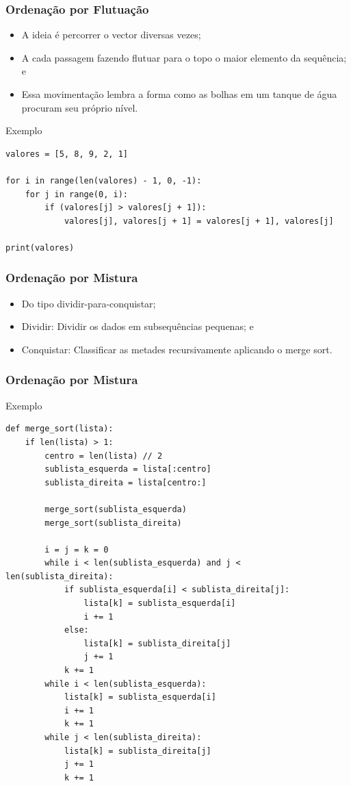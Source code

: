 \documentclass{beamer}
\begin{document}
\begin{frame}[fragile]
\frametitle{Ordenação por Flutuação}

\begin{itemize}
	\item A ideia é percorrer o vector diversas vezes;
	\item A cada passagem fazendo flutuar para o topo o maior elemento da
	sequência; e
	\item Essa movimentação lembra a forma como as bolhas em um tanque de
	água procuram seu próprio nível.
\end{itemize}

\begin{exampleblock}{Exemplo}
	\begin{lstlisting}
valores = [5, 8, 9, 2, 1]

for i in range(len(valores) - 1, 0, -1):
    for j in range(0, i):
        if (valores[j] > valores[j + 1]):
            valores[j], valores[j + 1] = valores[j + 1], valores[j] 

print(valores)
	\end{lstlisting}
\end{exampleblock}
\end{frame}

\begin{frame}
\frametitle{Ordenação por Mistura}

\begin{itemize}
	\item Do tipo dividir-para-conquistar;
	\item Dividir: Dividir os dados em subsequências pequenas; e
	\item Conquistar: Classificar as metades recursivamente aplicando o merge
	sort.
\end{itemize}
\end{frame}

\begin{frame}[fragile]
\frametitle{Ordenação por Mistura}

\begin{exampleblock}{Exemplo}
	\begin{lstlisting}
def merge_sort(lista):
    if len(lista) > 1:
        centro = len(lista) // 2
        sublista_esquerda = lista[:centro]
        sublista_direita = lista[centro:]

        merge_sort(sublista_esquerda)
        merge_sort(sublista_direita)

        i = j = k = 0
        while i < len(sublista_esquerda) and j < len(sublista_direita):
            if sublista_esquerda[i] < sublista_direita[j]:
                lista[k] = sublista_esquerda[i]
                i += 1
            else:
                lista[k] = sublista_direita[j]
                j += 1
            k += 1
        while i < len(sublista_esquerda):
            lista[k] = sublista_esquerda[i]
            i += 1
            k += 1
        while j < len(sublista_direita):
            lista[k] = sublista_direita[j]
            j += 1
            k += 1
	\end{lstlisting}
\end{exampleblock}
\end{frame}
\end{document}
